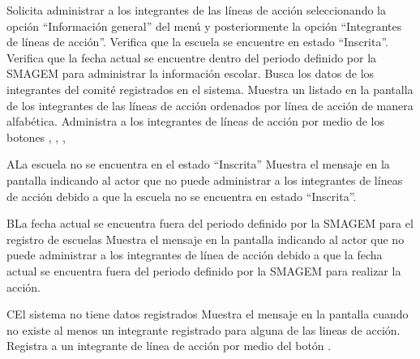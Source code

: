  \begin{UCtrayectoria}
      \UCpaso[\UCactor] Solicita administrar a los integrantes de las líneas de acción seleccionando la opción ``Información general'' del menú  y posteriormente la opción ``Integrantes de líneas de acción''. 
    \UCpaso[\UCsist] Verifica que la escuela se encuentre en estado ``Inscrita''.  
    \UCpaso[\UCsist] Verifica que la fecha actual se encuentre dentro del periodo definido por la SMAGEM para administrar la información escolar. 
    \UCpaso[\UCsist] Busca los datos de los integrantes del comité registrados en el sistema. 
    \UCpaso[\UCsist] Muestra un listado en la pantalla  de los integrantes de las líneas de acción ordenados por línea de acción de manera alfabética.
    \UCpaso[\UCactor] Administra a los integrantes de líneas de acción por medio de los botones , \botEdit, \botV, \botKo  \label{cur13:Acciones}
 \end{UCtrayectoria}

 
  \begin{UCtrayectoriaA}{A}{La escuela no se encuentra en el estado ``Inscrita''}
    \UCpaso[\UCsist] Muestra el mensaje  en la pantalla  indicando al actor que no puede administrar a los integrantes de líneas de acción debido a que la escuela no se encuentra en estado ``Inscrita''.
 \end{UCtrayectoriaA}

 \begin{UCtrayectoriaA}{B}{La fecha actual se encuentra fuera del periodo definido por la SMAGEM para el registro de escuelas}
    \UCpaso[\UCsist] Muestra el mensaje  en la pantalla  indicando al actor que no puede administrar a los integrantes de línea de acción debido a que la fecha actual se encuentra fuera del periodo definido por la SMAGEM para realizar la acción.
 \end{UCtrayectoriaA}
 
 \begin{UCtrayectoriaA}{C}{El sistema no tiene datos registrados}
    \UCpaso[\UCsist] Muestra el mensaje  en la pantalla  cuando no existe al menos un integrante registrado para alguna de las lineas de acción.
    \UCpaso[\UCactor] Registra a un integrante de línea de acción por medio del botón .
 \end{UCtrayectoriaA}

